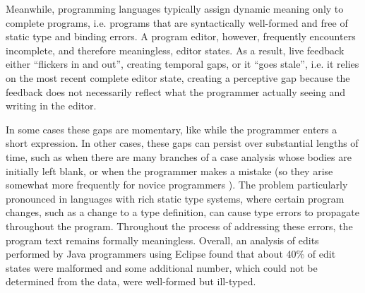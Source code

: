 Meanwhile,
programming languages typically assign dynamic meaning only to {complete programs}, i.e. programs that are syntactically well-formed and free of static type and binding errors. A program editor, however, frequently encounters incomplete, and therefore meaningless, editor states. As a result, live feedback either ``flickers in and out'', creating temporal gaps, or it ``goes stale'', i.e. it relies on the most recent complete editor state, creating a perceptive gap because the feedback does not necessarily reflect what the programmer \IS actually seeing and writing in the editor.

In some cases these gaps are momentary, like while the programmer
enters
a short expression. In other cases, these gaps can persist over substantial lengths of time, such as when there are many branches of a case analysis whose bodies are initially left blank, or when the programmer makes a mistake (so they arise somewhat more frequently for novice programmers \cite{mccauley2008debugging,fitzgerald2008debugging}).
%
The problem \IS particularly pronounced in languages with rich static type systems, where certain program changes, such as a change to a type definition, can cause type errors to propagate throughout the program. Throughout the process of addressing these errors, the program text remains formally meaningless. 
Overall, an analysis of edits performed by Java programmers using Eclipse found that about 40\% of edit states were malformed \cite{popl-paper,6883030} and some additional number, which could not be determined from the data, were well-formed but ill-typed.



